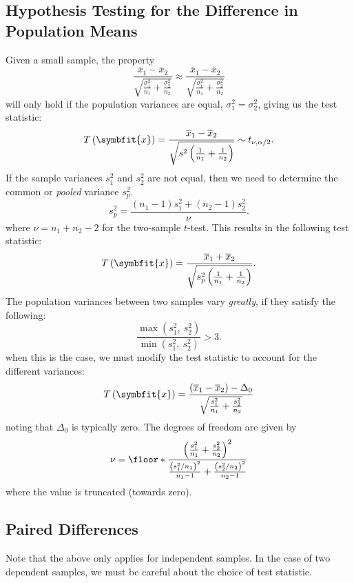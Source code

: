 \documentclass{article}
\begin{document}
\begin{multicols}{3}
\subsection{Hypothesis Testing for the Difference in Population Means}
Given a small sample, the property
\begin{equation*}
    \frac{\overline{x}_1 - \overline{x}_2}{\sqrt{\frac{\sigma_1^2}{n_1} + \frac{\sigma_2^2}{n_2}}} \approx \frac{\overline{x}_1 - \overline{x}_2}{\sqrt{\frac{\sigma_1^2}{n_1} + \frac{\sigma_2^2}{n_2}}}
\end{equation*}
will only hold if the population variances are equal, \(\sigma_1^2 = \sigma_2^2\), giving
us the test statistic:
\begin{equation*}
    T\left( \symbfit{x} \right) = \frac{\overline{x}_1 - \overline{x}_2}{\sqrt{s^2\left( \frac{1}{n_1} + \frac{1}{n_2} \right)}} \sim t_{\nu, \alpha/2}.
\end{equation*}
If the sample variances \(s_1^2\) and \(s_2^2\) are not equal, then we
need to determine the common or \textit{pooled} variance \(s_p^2\).
\begin{equation*}
    s_p^2 = \frac{\left( n_1 - 1 \right)s_1^2 + \left( n_2 - 1 \right)s_2^2}{\nu}.
\end{equation*}
where \(\nu = n_1 + n_2 - 2\) for the two-sample \(t\)-test.
This results in the following test statistic:
\begin{equation*}
    T\left( \symbfit{x} \right) = \frac{\overline{x}_1 + \overline{x}_2}{\sqrt{s_p^2 \left( \frac{1}{n_1} + \frac{1}{n_2} \right)}}.
\end{equation*}
The population variances between two samples vary \textit{greatly}, if
they satisfy the following:
\begin{equation*}
    \frac{\max{\left( s_1^2,\: s_2^2 \right)}}{\min{\left( s_1^2,\: s_2^2 \right)}} > 3.
\end{equation*}
when this is the case, we must modify the test statistic to account for the
different variances:
\begin{equation*}
    T\left( \symbfit{x} \right) = \frac{\left( \overline{x}_1 - \overline{x}_2 \right) - \Delta_0}{\sqrt{\frac{s_1^2}{n_1} + \frac{s_2^2}{n_2}}}
\end{equation*}
noting that \(\Delta_0\) is typically zero. The degrees of freedom are given by
\begin{equation*}
    \nu = \floor*{\frac{\left( \frac{s_1^2}{n_1} + \frac{s_2^2}{n_2} \right)^2}{\frac{\left( s_1^2 / n_1 \right)^2}{n_1 - 1} + \frac{\left( s_2^2 / n_2 \right)^2}{n_2 - 1}}}
\end{equation*}
where the value is truncated (towards zero).
\subsection{Paired Differences}
Note that the above only applies for independent samples.
In the case of two dependent samples, we must be careful about the choice
of test statistic.

        
\end{multicols}
\end{document}

